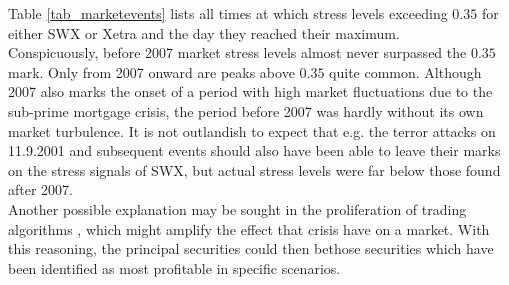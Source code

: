 \documentclass[11pt,twoside,a4paper]{article}
\numberwithin{equation}{section}
\numberwithin{figure}{section}
\numberwithin{table}{section}
\begin{document}
Table \ref{tab_marketevents} lists all times at which stress levels exceeding $0.35$ for either SWX or Xetra and the day they reached their maximum.\\

Conspicuously, before 2007 market stress levels almost never surpassed the $0.35$ mark. Only from 2007 onward are peaks above $0.35$ quite common. Although 2007 also marks the onset of a period with high market fluctuations due to the sub-prime mortgage crisis, the period before 2007 was hardly without its own market turbulence. It is not outlandish to expect that e.g. the terror attacks on 11.9.2001 and subsequent events should also have been able to leave their marks on the stress signals of SWX, but actual stress levels were far below those found after 2007.\\
Another possible explanation may be sought in the proliferation of trading algorithms \cite{SWX20070403, SWX20070705}, which might amplify the effect that crisis have on a market. With this reasoning, the principal securities could then bethose securities which have been identified as most profitable in specific scenarios.\\
\end{document}
